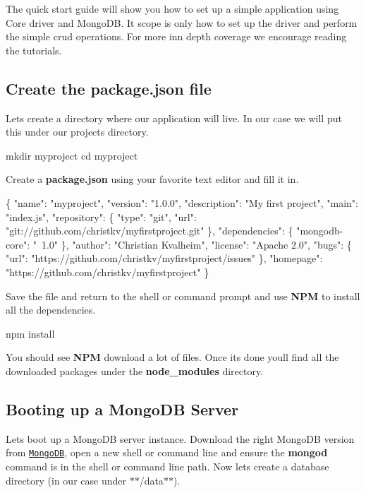 The quick start guide will show you how to set up a simple application using Core driver and Mongo\+DB. It scope is only how to set up the driver and perform the simple crud operations. For more inn depth coverage we encourage reading the tutorials.

\subsection*{Create the package.\+json file}

Let\textquotesingle{}s create a directory where our application will live. In our case we will put this under our projects directory.


\begin{DoxyCode}
mkdir myproject
cd myproject
\end{DoxyCode}


Create a {\bfseries package.\+json} using your favorite text editor and fill it in.


\begin{DoxyCode}
\{
  "name": "myproject",
  "version": "1.0.0",
  "description": "My first project",
  "main": "index.js",
  "repository": \{
    "type": "git",
    "url": "git://github.com/christkv/myfirstproject.git"
  \},
  "dependencies": \{
    "mongodb-core": "~1.0"
  \},
  "author": "Christian Kvalheim",
  "license": "Apache 2.0",
  "bugs": \{
    "url": "https://github.com/christkv/myfirstproject/issues"
  \},
  "homepage": "https://github.com/christkv/myfirstproject"
\}
\end{DoxyCode}


Save the file and return to the shell or command prompt and use {\bfseries N\+PM} to install all the dependencies.


\begin{DoxyCode}
npm install
\end{DoxyCode}


You should see {\bfseries N\+PM} download a lot of files. Once it\textquotesingle{}s done you\textquotesingle{}ll find all the downloaded packages under the {\bfseries node\+\_\+modules} directory.

\subsection*{Booting up a Mongo\+DB Server }

Let\textquotesingle{}s boot up a Mongo\+DB server instance. Download the right Mongo\+DB version from \href{http://www.mongodb.org}{\tt Mongo\+DB}, open a new shell or command line and ensure the {\bfseries mongod} command is in the shell or command line path. Now let\textquotesingle{}s create a database directory (in our case under $\ast$$\ast$/data$\ast$$\ast$).


